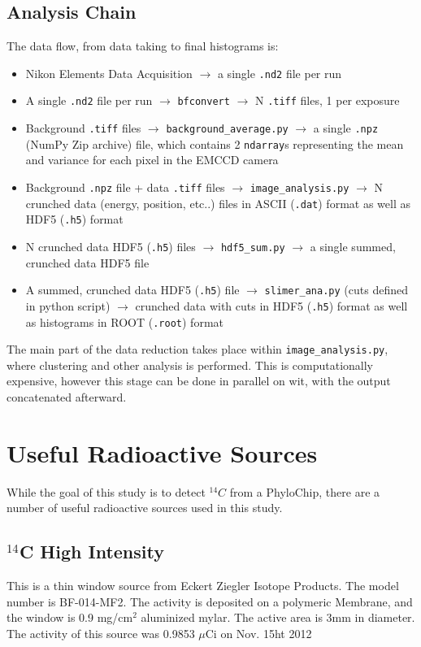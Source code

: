 \documentclass[11pt]{article}
\newcommand{\nuc}[2]{\ensuremath{^{#1}}#2}
\begin{document}
\subsection{Analysis Chain}
The data flow, from data taking to final histograms is:
\begin{itemize}
	\item Nikon Elements Data Acquisition $\rightarrow$ a single \verb+.nd2+ file per run
	\item A single \verb+.nd2+ file per run $\rightarrow$ \verb+bfconvert+ $\rightarrow$ N \verb+.tiff+ files, 1 per exposure
	\item  Background \verb+.tiff+ files $\rightarrow$ \verb+background_average.py+ $\rightarrow$ a single \verb+.npz+ (NumPy Zip archive) file, which contains 2 \verb+ndarray+s representing the mean and variance for each pixel in the EMCCD camera
	\item Background  \verb+.npz+ file + data \verb+.tiff+ files  $\rightarrow$ \verb+image_analysis.py+ $\rightarrow$ N crunched data  (energy, position, etc..) files in ASCII (\verb+.dat+) format as well as HDF5 (\verb+.h5+) format
	\item  N crunched data HDF5 (\verb+.h5+) files $\rightarrow$  \verb+hdf5_sum.py+ $\rightarrow$ a single summed, crunched data HDF5 file 
	\item A summed, crunched data HDF5 (\verb+.h5+) file  $\rightarrow$ \verb+slimer_ana.py+ (cuts defined in python script) $\rightarrow$ crunched data with cuts in HDF5 (\verb+.h5+) format as well as histograms in ROOT (\verb+.root+) format
	\end{itemize}
The main part of the data reduction takes place within \verb+image_analysis.py+, where clustering and other analysis is performed. This is computationally expensive, however this stage can be done in parallel on wit, with the output concatenated afterward. 



\section{Useful Radioactive Sources} %
While the goal of this study is to detect $^{14}C$ from a PhyloChip, there are a number of useful radioactive sources used in this study. 
\subsection{\nuc{14}{C} High Intensity}
This is a thin window source from Eckert Ziegler Isotope Products. The model number is BF-014-MF2. The activity is deposited on a polymeric Membrane, and the window is 0.9 mg/cm$^{2}$ aluminized mylar.
The active area is 3mm in diameter. The activity of this source was 0.9853 $\mu$Ci on Nov. 15ht 2012
\end{document}

